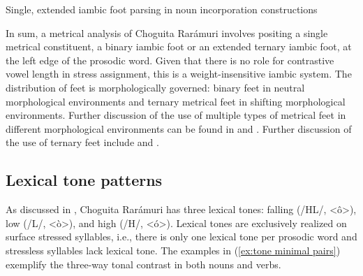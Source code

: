 \ea\label{ex: single extended iambic foot parsing in noun incorporation}
{Single, extended iambic foot parsing in noun incorporation constructions}
    \z
\z

In sum, a metrical analysis of Choguita Rarámuri involves positing a single metrical constituent, a binary iambic foot or an extended ternary iambic foot, at the left edge of the prosodic word. Given that there is no role for contrastive vowel length in stress assignment, this is a weight-insensitive iambic system. The distribution of feet is morphologically governed: binary feet in neutral morphological environments and ternary metrical feet in shifting morphological environments. Further discussion of the use of multiple types of metrical feet in different morphological environments can be found in \citet{bennett2012foot} and \citet{bennett2013uniqueness}. Further discussion of the use of ternary feet include \citet{martinez2013exploration} and \citet{martinez2015binary}.

\subsection{Lexical tone patterns}
\label{subsec: lexical tone patterns}

As discussed in , Choguita Rarámuri has three lexical tones: falling (/HL/, <ô>), low (/L/, <ò>), and high (/H/, <ó>). Lexical tones are exclusively realized on surface stressed syllables, i.e., there is only one lexical tone per prosodic word and stressless syllables lack lexical tone.  The examples in (\ref{ex:tone minimal pairs}) exemplify the three-way tonal contrast \citep [][465]{caballero2015tone} in both nouns and verbs.

